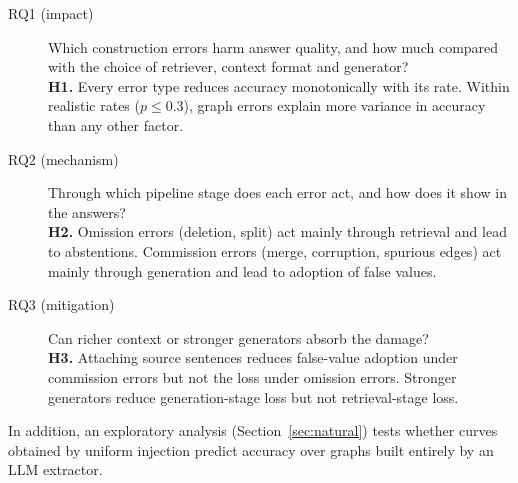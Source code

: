 \documentclass[11pt]{article}
\begin{document}
\begin{description}
\item[RQ1 (impact)] Which construction errors harm answer quality, and how much compared with the choice of retriever, context format and generator?\\
\textbf{H1.} Every error type reduces accuracy monotonically with its rate. Within realistic rates ($p\le0.3$), graph errors explain more variance in accuracy than any other factor.
\item[RQ2 (mechanism)] Through which pipeline stage does each error act, and how does it show in the answers?\\
\textbf{H2.} Omission errors (deletion, split) act mainly through retrieval and lead to abstentions. Commission errors (merge, corruption, spurious edges) act mainly through generation and lead to adoption of false values.
\item[RQ3 (mitigation)] Can richer context or stronger generators absorb the damage?\\
\textbf{H3.} Attaching source sentences reduces false-value adoption under commission errors but not the loss under omission errors. Stronger generators reduce generation-stage loss but not retrieval-stage loss.
\end{description}

In addition, an exploratory analysis (Section~\ref{sec:natural}) tests whether curves obtained by uniform injection predict accuracy over graphs built entirely by an LLM extractor.
\end{document}
